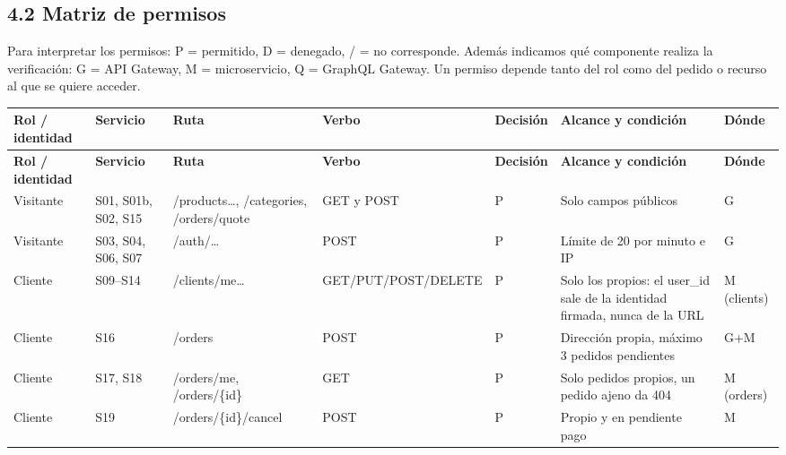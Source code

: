 \documentclass[10pt,letterpaper]{article}
\begin{document}
\subsection*{4.2 Matriz de permisos}
Para interpretar los permisos: P = permitido, D = denegado, /\allowbreak{}  = no corresponde. Además indicamos qué componente realiza la verificación: G = API Gateway, M = microservicio, Q = GraphQL Gateway. Un permiso depende tanto del rol como del pedido o recurso al que se quiere acceder.

{\scriptsize
\begin{longtable}{|P{\tabcolsep\relax}|P{\tabcolsep\relax}|P{\tabcolsep\relax}|P{\tabcolsep\relax}|P{\tabcolsep\relax}|P{\tabcolsep\relax}|P{\tabcolsep\relax}|}
\hline
\textbf{Rol /\allowbreak{} identidad} & \textbf{Servicio} & \textbf{Ruta} & \textbf{Verbo} & \textbf{Decisión} & \textbf{Alcance y condición} & \textbf{Dónde} \\ \hline
\endfirsthead
\hline
\textbf{Rol /\allowbreak{} identidad} & \textbf{Servicio} & \textbf{Ruta} & \textbf{Verbo} & \textbf{Decisión} & \textbf{Alcance y condición} & \textbf{Dónde} \\ \hline
\endhead
Visitante & S01, S01b, S02, S15 & /\allowbreak{}products…, /\allowbreak{}categories, /\allowbreak{}orders/\allowbreak{}quote & GET y POST & P & Solo campos públicos & G \\ \hline
Visitante & S03, S04, S06, S07 & /\allowbreak{}auth/\allowbreak{}… & POST & P & Límite de 20 por minuto e IP & G \\ \hline
Cliente & S09–S14 & /\allowbreak{}clients/\allowbreak{}me… & GET/\allowbreak{}PUT/\allowbreak{}POST/\allowbreak{}DELETE & P & Solo los propios: el user\_\allowbreak{}id sale de la identidad firmada, nunca de la URL & M (clients) \\ \hline
Cliente & S16 & /\allowbreak{}orders & POST & P & Dirección propia, máximo 3 pedidos pendientes & G+M \\ \hline
Cliente & S17, S18 & /\allowbreak{}orders/\allowbreak{}me, /\allowbreak{}orders/\allowbreak{}\{id\} & GET & P & Solo pedidos propios, un pedido ajeno da 404 & M (orders) \\ \hline
Cliente & S19 & /\allowbreak{}orders/\allowbreak{}\{id\}/\allowbreak{}cancel & POST & P & Propio y en pendiente pago & M \\ \hline

\end{longtable}}
\end{document}
